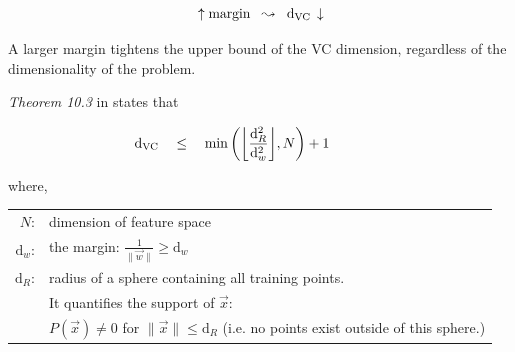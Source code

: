 \begin{frame}

\slidesonly{\vspace{-5mm}} 

\\

\slidesonly{\vspace{-5mm}} 

\begin{equation}
\, \uparrow \text{margin} \;\; \leadsto \;\; \mathrm{d}_{\mathrm{VC}} \, \downarrow   
\end{equation}


A larger margin tightens the upper bound of the VC dimension, regardless of the dimensionality of the problem. 

\begin{block}{\textit{Theorem 10.3} in \citep{Vapnik1998}}
states that

\begin{equation}
    \mathrm{d}_{\mathrm{VC}} \quad\leq\quad \min \bigg( \bigg\lfloor 
    \frac{\mathrm{d}_R^2}{\mathrm{d}_{{w}}^2}
\bigg\rfloor, N \bigg) + 1\qquad\qquad
\label{eq:dvcmarginbound}
\end{equation}

where,\\

\begin{tabular}{rl}
    $N$\;:& dimension of feature space \\[1mm]
    $\mathrm{d}_w$\;:& the margin: 
        $\frac{1}{\|\vec w \|} \geq \mathrm{d}_w$ \\[1mm]
    $\mathrm{d}_R$\;:& radius of a sphere containing all training points.\\
    &It quantifies the support of $\vec x$:\\
    & $P(\vec x) \neq 0$ for $\|\vec x\| \leq \mathrm{d}_R$ (i.e. no points exist outside of this sphere.)
\end{tabular}
\end{block}



\end{frame}
